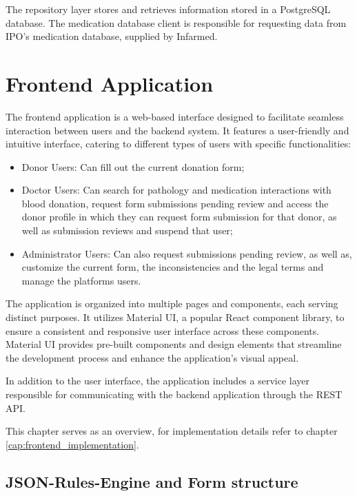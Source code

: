 The repository layer stores and retrieves information stored in a PostgreSQL database.
The medication database client is responsible for requesting data from IPO's medication database, supplied by Infarmed.






\section{Frontend Application}\label{architecture_frontend}

The frontend application is a web-based interface designed to facilitate seamless interaction between users and the backend system. It features a user-friendly and intuitive interface, catering to different types of users with specific functionalities:

\begin{itemize}
	\item Donor Users: Can fill out the current donation form;
	\item Doctor Users: Can search for pathology and medication interactions with blood donation, request form submissions pending review and access the donor profile in which they can request form submission for that donor, as well as submission reviews and suspend that user;
	\item Administrator Users: Can also request submissions pending review, as well as, customize the current form, the inconsistencies and the legal terms and manage the platforms users.
\end{itemize}

The application is organized into multiple pages and components, each serving distinct purposes. It utilizes Material UI, a popular React component library, to ensure a consistent and responsive user interface across these components. Material UI provides pre-built components and design elements that streamline the development process and enhance the application's visual appeal.

In addition to the user interface, the application includes a service layer responsible for communicating with the backend application through the REST API.

This chapter serves as an overview, for implementation details refer to chapter \ref{cap:frontend_implementation}.

\subsection{JSON-Rules-Engine and Form structure}\label{arc_jre}

